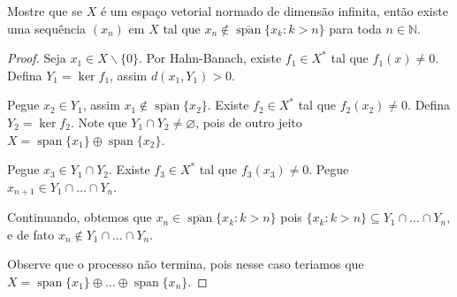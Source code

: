 \documentclass[portuguese]{article}
\theoremstyle{definition}
\newcommand{\N}{\mathbb{N}}
\begin{document}
	\begin{exer*}[8]
		Mostre que se $X$ é um espaço vetorial normado de dimensão infinita, então existe uma sequência $(x_n)$ em $X$ tal que $x_n\notin\overline{\operatorname{span}}\{x_k:k>n\}$ para toda $n\in\N$.
	\end{exer*}
	\begin{proof}
		Seja $x_1\in X\backslash\{0\}$. Por Hahn-Banach, existe $f_1\in X^*$ tal que $f_1(x)\neq0$. Defina $Y_1=\ker f_1$, assim $d(x_1,Y_1)>0$.
		
		Pegue $x_2\in Y_1$, assim $x_1\notin\overline{\operatorname{span}}\{x_2\}$. Existe $f_2\in X^*$ tal que $f_2(x_2)\neq0$. Defina $Y_2=\ker f_2$. Note que $Y_1\cap Y_2\neq\varnothing$, pois de outro jeito $X=\operatorname{span}\{x_1\}\oplus \operatorname{span}\{x_2\}$. 
		
		Pegue $x_3\in Y_1\cap Y_2$. Existe $f_3\in X^*$ tal que $f_3(x_3)\neq0$. Pegue $x_{n+1}\in Y_1\cap\ldots\cap Y_n$.
		
		Continuando, obtemos que $x_n\in\overline{\operatorname{span}}\{x_k:k>n\}$ pois $\{x_k:k>n\}\subseteq Y_1\cap\ldots\cap Y_n$, e de fato $x_n\notin Y_1\cap\ldots\cap Y_n$.
		
		Observe que o processo não termina, pois nesse caso teriamos que $X=\operatorname{span}\{x_1\}\oplus\ldots\oplus\operatorname{span}\{x_n\}$.
	\end{proof}
	
\end{document}
